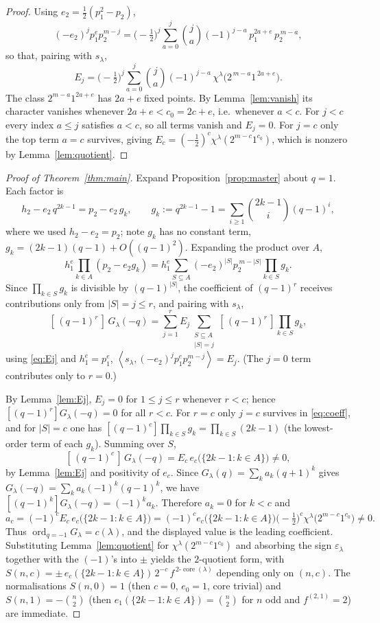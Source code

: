 \documentclass[11pt]{article}
\theoremstyle{definition}
\DeclareMathOperator{\ord}{ord}
\DeclareMathOperator{\core}{core}
\newcommand{\la}{\lambda}
\newcommand{\inner}[1]{\left\langle #1 \right\rangle}
\begin{document}
\begin{proof}
Using $e_2=\tfrac12(p_1^2-p_2)$,
\[
  (-e_2)^j p_1^e p_2^{m-j}
  =\Big(-\tfrac12\Big)^{j}\sum_{a=0}^{j}\binom ja(-1)^{j-a}\,p_1^{2a+e}\,p_2^{\,m-a},
\]
so that, pairing with $s_\la$,
\[
  E_j=\Big(-\tfrac12\Big)^{j}\sum_{a=0}^{j}\binom ja(-1)^{j-a}\,
       \chi^\la\!\big(2^{\,m-a}1^{\,2a+e}\big).
\]
The class $2^{m-a}1^{2a+e}$ has $2a+e$ fixed points. By Lemma~\ref{lem:vanish} its
character vanishes whenever $2a+e<c_0=2c+e$, i.e.\ whenever $a<c$. For $j<c$ every
index $a\le j$ satisfies $a<c$, so all terms vanish and $E_j=0$. For $j=c$ only the
top term $a=c$ survives, giving
$E_{c}=(-\tfrac12)^{c}\chi^\la(2^{m-c}1^{c_0})$, which is nonzero by
Lemma~\ref{lem:quotient}.
\end{proof}

\begin{proof}[Proof of Theorem~\ref{thm:main}]
Expand Proposition~\ref{prop:master} about $q=1$. Each factor is
\[
  h_2-e_2\,q^{2k-1}=p_2-e_2\,g_k,\qquad g_k:=q^{2k-1}-1=\sum_{i\ge1}\binom{2k-1}{i}(q-1)^i ,
\]
where we used $h_2-e_2=p_2$; note $g_k$ has no constant term, $g_k=(2k-1)(q-1)+O((q-1)^2)$.
Expanding the product over $A$,
\[
  h_1^e\prod_{k\in A}(p_2-e_2 g_k)
  =h_1^e\sum_{S\subseteq A}(-e_2)^{|S|}p_2^{\,m-|S|}\prod_{k\in S}g_k .
\]
Since $\prod_{k\in S}g_k$ is divisible by $(q-1)^{|S|}$, the coefficient of $(q-1)^r$
receives contributions only from $|S|=j\le r$, and pairing with $s_\la$,
\begin{equation}\label{eq:coeff}
  [\,(q-1)^r\,]\,G_\la(-q)
  =\sum_{j=1}^{r} E_j\!\!\sum_{\substack{S\subseteq A\\ |S|=j}}\!
    [\,(q-1)^r\,]\!\prod_{k\in S}g_k ,
\end{equation}
using \eqref{eq:Ej} and $h_1^e=p_1^e$, $\inner{s_\la,(-e_2)^jp_1^ep_2^{m-j}}=E_j$.
(The $j=0$ term contributes only to $r=0$.)

By Lemma~\ref{lem:Ej}, $E_j=0$ for $1\le j\le r$ whenever $r<c$; hence
$[(q-1)^r]G_\la(-q)=0$ for all $r<c$. For $r=c$ only $j=c$ survives in
\eqref{eq:coeff}, and for $|S|=c$ one has
$[(q-1)^c]\prod_{k\in S}g_k=\prod_{k\in S}(2k-1)$ (the lowest-order term of each
$g_k$). Summing over $S$,
\[
  [\,(q-1)^c\,]\,G_\la(-q)=E_{c}\,e_{c}\!\big(\{2k-1:k\in A\}\big)\neq 0,
\]
by Lemma~\ref{lem:Ej} and positivity of $e_c$. Since
$G_\la(q)=\sum_k a_k(q+1)^k$ gives
$G_\la(-q)=\sum_k a_k(-1)^k(q-1)^k$, we have
$[(q-1)^k]G_\la(-q)=(-1)^k a_k$. Therefore $a_k=0$ for $k<c$ and
\[
  a_{c}=(-1)^{c}E_{c}\,e_{c}\!\big(\{2k-1:k\in A\}\big)
       =(-1)^{c}e_{c}\!\big(\{2k-1:k\in A\}\big)\Big(-\tfrac12\Big)^{c}\chi^\la\!\big(2^{m-c}1^{c_0}\big)\neq0.
\]
Thus $\ord_{q=-1}G_\la=c(\la)$, and the displayed value is the leading coefficient.
Substituting Lemma~\ref{lem:quotient} for $\chi^\la(2^{m-c}1^{c_0})$ and absorbing the
sign $\varepsilon_\la$ together with the $(-1)$'s into $\pm$ yields the
$2$-quotient form, with
$S(n,c)=\pm\,e_c(\{2k-1:k\in A\})\,2^{-c}\,f^{\,2\text{-}\core(\la)}$ depending only on
$(n,c)$. The normalisations $S(n,0)=1$ (then $c=0$, $e_0=1$, core trivial) and
$S(n,1)=-\binom n2$ (then $e_1(\{2k-1:k\in A\})=\binom n2$ for $n$ odd and
$f^{(2,1)}=2$) are immediate.
\end{proof}
\end{document}
